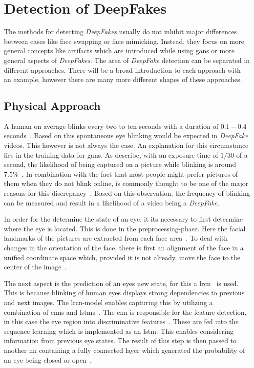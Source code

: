 \section{Detection of DeepFakes}\label{sect:detection}
The methods for detecting \textit{DeepFakes} usually do not inhibit major differences
between cases like face swapping or face mimicking.
Instead, they focus on more general concepts like artifacts which are introduced
while using \glspl{gan} or more general aspects of \textit{DeepFakes}.
The area of \textit{DeepFake} detection can be separated in different approaches.
There will be a broad introduction to each approach with an example, however there
are many more different shapes of these approaches.

\subsection{Physical Approach}
A human on average blinks every two to ten seconds with a duration of \(0.1-0.4\)
seconds~\cite{li_ictu_2018}. Based on this spontaneous eye blinking would be
expected in \textit{DeepFake} videos. This however is not always the case. An
explanation for this circumstance lies in the training data for \glspl{gan}. As 
\textcite{li_ictu_2018} describe, with an exposure time of \(1/30\) of a second,
the likelihood of being captured on a picture while blinking is around \(7.5\%\)~\cite{li_ictu_2018}.
In combination with the fact that most people might prefer pictures of them when
they do not blink online, is commonly thought to be one of the major reasons for
this discrepancy~\cite{pishori_detecting_2020}. Based on this observation, the
frequency of blinking can be measured and result in a likelihood of a video being
a \textit{DeepFake}.

\par
In order for the determine the state of an eye, it its necessary to first determine
where the eye is located. This is done in the preprocessing-phase. Here the facial
landmarks of the pictures are extracted from each face area~\cite{li_ictu_2018}.
To deal with changes in the orientation of the face, there is first an alignment
of the face in a unified coordinate space which, provided it is not already,
move the face to the center of the image~\cite{li_ictu_2018}.

\par
The next aspect is the prediction of an eyes new state, for this a \gls{lrcn}~\cite{donahue_long-term_2014}
is used. This is because blinking of human eyes displays strong dependencies to
previous and next images. The \gls{lrcn}-model enables capturing this by utilizing
a combination of \glspl{cnn} and \glspl{lstm}~\cite{donahue_long-term_2014}.
The \gls{cnn} is responsible for the feature detection, in this case the eye
region into discriminative features~\cite{li_ictu_2018,donahue_long-term_2014}. 
These are fed into the sequence learning which is implemented as an \gls{lstm}.
This enables considering information from previous eye states. The result of
this step is then passed to another \gls{nn} containing a fully connected layer
which generated the probability of an eye being closed or open~\cite{li_ictu_2018}.

